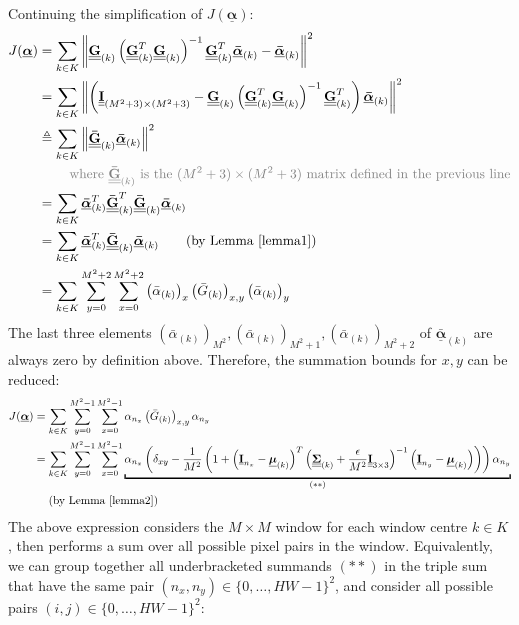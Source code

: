 \documentclass{article}
\theoremstyle{definition}
\newcommand{\textgrey}[1]{\textcolor{gray}{#1}}
\def\vt#1{\underline{\mathbf{#1}}}
\def\vts#1{\underline{\boldsymbol{#1}}}
\def\mt#1{\underline{\underline{\mathbf{#1}}}}
\def\mts#1{\underline{\underline{\boldsymbol{#1}}}}
\begin{document}
Continuing the simplification of $J(\vts\alpha)$:
\begin{align*}
    J(\vts\alpha) &=  \sum_{k\in K} \left\| \mt G_{(k)}\left(\mt G_{(k)}^T \mt G_{(k)} \right)^{-1} \mt G_{(k)}^T \vts{\bar{\alpha}}_{(k)}  - \vts{\bar{\alpha}}_{(k)} \right\|^2\\
    &=  \sum_{k\in K} \left\| \left(\mt I_{(M^2+3)\times(M^2+3)} -  \mt G_{(k)}\left(\mt G_{(k)}^T \mt G_{(k)} \right)^{-1} \mt G_{(k)}^T \right) \vts{\bar{\alpha}}_{(k)}   \right\|^2\\
    &\triangleq  \sum_{k\in K} \left\| \mt{\bar{G}}_{(k)} \vts{\bar{\alpha}}_{(k)}   \right\|^2\\
    &\quad\quad\ \textgrey{\text{where $\mt{\bar{G}}_{(k)}$ is the $(M^2+3)\times(M^2+3)$ matrix defined in the previous line}}\\
    &= \sum_{k\in K} \vts{\bar{\alpha}}_{(k)}^T \mt{\bar{G}}_{(k)}^T \mt{\bar{G}}_{(k)} \vts{\bar{\alpha}}_{(k)}\\
    &= \sum_{k\in K} \vts{\bar{\alpha}}_{(k)}^T  \mt{\bar{G}}_{(k)} \vts{\bar{\alpha}}_{(k)} \qquad\text{(by Lemma \ref{lemma1})}\\
    &= \sum_{k\in K} \sum_{y=0}^{M^2+2} \sum_{x=0}^{M^2+2} \left({\bar{\alpha}}_{(k)}\right)_x  \left({\bar{G}}_{(k)}\right)_{x,y} \left({\bar{\alpha}}_{(k)}\right)_y
\end{align*}
The last three elements $\left({\bar{\alpha}}_{(k)}\right)_{M^2}, \left({\bar{\alpha}}_{(k)}\right)_{M^2+1}, \left({\bar{\alpha}}_{(k)}\right)_{M^2+2}$ of $\vts{\bar{\alpha}}_{(k)}$ are always zero by definition above. Therefore, the summation bounds for $x,y$ can be reduced: %
\begin{align*}
    J(\vts\alpha) &= \sum_{k\in K} \sum_{y=0}^{M^2-1} \sum_{x=0}^{M^2-1} \alpha_{n_x}  \left({\bar{G}}_{(k)}\right)_{x,y} \alpha_{n_y}\\
    &= \sum_{k\in K} \sum_{y=0}^{M^2-1} \sum_{x=0}^{M^2-1} \underbracket{\alpha_{n_x}  \left( \delta_{xy} - \frac1{M^2}\left(1 + \left(\vt{I}_{n_x} - \vts \mu_{(k)}\right)^T \left(\mts \Sigma_{(k)} + \frac\epsilon{M^2} \mt{I}_{3\times 3}\right)^{-1} \left(\vt{I}_{n_y} - \vts \mu_{(k)}\right) \right) \right) \alpha_{n_y}}_{(**)}\\
    &\quad\ \text{(by Lemma \ref{lemma2})}
\end{align*}
The above expression considers the $M\times M$ window for each window centre $k\in K$, then performs a sum over all possible pixel pairs in the window. Equivalently, we can group together all underbracketed summands $(**)$ in the triple sum that have the same pair $(n_x,n_y)\in\{0,\dots,HW-1\}^2$, and consider all possible pairs $(i,j)\in\{0,\dots,HW-1\}^2$: \label{appendix:theorem-1-project}
\end{document}

